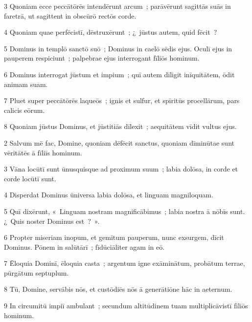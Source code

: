 \psalmVerse
  {\phantom{00}3}
  {Quoniam ecce peccātōrēs intendērunt arcum~; parāvērunt sagittās suās in faretrā, ut sagittent in obscūrō rectōs corde.}


\psalmVerse
  {\phantom{00}4}
  {Quoniam quae perfēcistī, dēstruxērunt~; ¿~jūstus autem, quid fēcit~?}


\psalmVerse
  {\phantom{00}5}
  {Dominus in templō sanctō suō~; Dominus in caelō sēdis ejus. Oculī ejus in pauperem respiciunt~; palpebrae ejus interrogant fīliōs hominum.}


\psalmVerse
  {\phantom{00}6}
  {Dominus interrogat jūstum et impium~; quī autem dīligit inīquitātem, ōdit animam suam.}


\psalmVerse
  {\phantom{00}7}
  {Pluet super peccātōrēs laqueōs~; ignis et sulfur, et spīritūs procellārum, pars calicis eōrum.}


\psalmVerse
  {\phantom{00}8}
  {Quoniam jūstus Dominus, et jūstitiās dīlexit~; aequitātem vīdit vultus ejus.}




\psalmVerse
  {\phantom{00}2}
  {Salvum mē fac, Domine, quoniam dēfēcit sanctus, quoniam dīminūtae sunt vēritātēs ā fīliīs hominum.}


\psalmVerse
  {\phantom{00}3}
  {Vāna locūtī sunt ūnusquisque ad proximum suum~; labia dolōsa, in corde et corde locūtī sunt.}


\psalmVerse
  {\phantom{00}4}
  {Disperdat Dominus ūniversa labia dolōsa, et linguam magniloquam.}


\psalmVerse
  {\phantom{00}5}
  {Quī dixērunt, «~Linguam nostram magnificābimus~; labia nostra ā nōbīs sunt. ¿~Quis noster Dominus est~?~».}


\psalmVerse
  {\phantom{00}6}
  {Propter miseriam inopum, et gemitum pauperum, nunc exsurgem, dīcit Dominus. Pōnem in salūtārī~; fīdūciāliter agam in eō.}


\psalmVerse
  {\phantom{00}7}
  {Ēloquia Dominī, ēloquia casta~; argentum igne exāminātum, probātum terrae, pūrgātum septuplum.}


\psalmVerse
  {\phantom{00}8}
  {Tū, Domine, servābis nōs, et custōdiēs nōs ā generātiōne hāc in aeternum.}


\psalmVerse
  {\phantom{00}9}
  {In circumitū impiī ambulant~; secundum altitūdinem tuam multiplicāvistī fīliōs hominum.}



